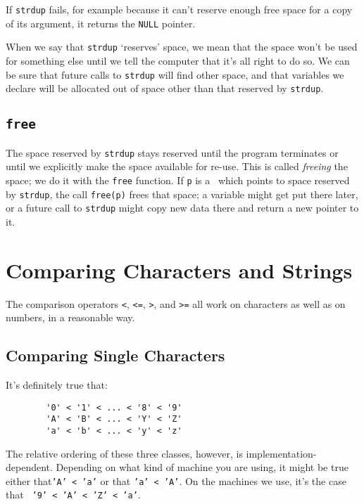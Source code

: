 If {\tt strdup} fails, for example because it can't reserve enough free
space for a copy of its argument, it returns the {\tt NULL} pointer.

When we say that {\tt strdup} `reserves' space, we mean that the space
won't be used for something else until we tell the computer that it's
all right to do so.  We can be sure that future calls to {\tt strdup}
will find other space, and that variables we declare will be allocated
out of space other than that reserved by {\tt strdup}.

\subsection{{\tt free}}

The space reserved by {\tt strdup} stays reserved until the program
terminates or until we explicitly make the space available for re-use.
This is called {\em freeing}\/ the space; we do it with the {\tt free}
function.  If {\tt p} is a \Char\ which points to space reserved by
{\tt strdup}, the call {\tt free(p)} frees that space; a variable might
get put there later, or a future call to {\tt strdup} might copy new
data there and return a new pointer to it.  

\section{Comparing Characters and Strings}

The comparison operators {\tt <}, {\tt <=}, {\tt >}, and {\tt >=} all
work on characters as well as on numbers, in a reasonable way. 

\subsection{Comparing Single Characters}

It's definitely true that:

\begin{verbatim}
        '0' < '1' < ... < '8' < '9'
        'A' < 'B' < ... < 'Y' < 'Z'
        'a' < 'b' < ... < 'y' < 'z'
\end{verbatim}

The relative ordering of these three classes, however, is
implementation-dependent.  Depending on what kind of machine you are
using, it might be true either that\mbox {\tt 'A' < 'a'} or that
\mbox{\tt 'a' < 'A'}.  On the machines we use, it's the case that {\tt
'9' < 'A' < 'Z' < 'a'}.


